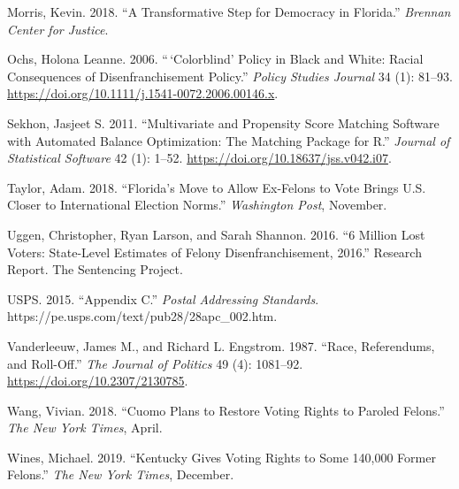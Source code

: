 \documentclass[
  12pt,
]{article}
\newlength{\cslhangindent}
\newenvironment{cslreferences}%
  {\setlength{\parindent}{0pt}%
  \everypar{\setlength{\hangindent}{\cslhangindent}}\ignorespaces}%
  {\par}
\begin{document}
\begin{cslreferences}
\leavevmode\hypertarget{ref-Morris2018}{}%
Morris, Kevin. 2018. ``A Transformative Step for Democracy in Florida.'' \emph{Brennan Center for Justice}.

\leavevmode\hypertarget{ref-Ochs2006}{}%
Ochs, Holona Leanne. 2006. ``\,`Colorblind' Policy in Black and White: Racial Consequences of Disenfranchisement Policy.'' \emph{Policy Studies Journal} 34 (1): 81--93. \url{https://doi.org/10.1111/j.1541-0072.2006.00146.x}.

\leavevmode\hypertarget{ref-Sekhon2011}{}%
Sekhon, Jasjeet S. 2011. ``Multivariate and Propensity Score Matching Software with Automated Balance Optimization: The Matching Package for R.'' \emph{Journal of Statistical Software} 42 (1): 1--52. \url{https://doi.org/10.18637/jss.v042.i07}.

\leavevmode\hypertarget{ref-Taylor2018}{}%
Taylor, Adam. 2018. ``Florida's Move to Allow Ex-Felons to Vote Brings U.S. Closer to International Election Norms.'' \emph{Washington Post}, November.

\leavevmode\hypertarget{ref-sentencing_2016}{}%
Uggen, Christopher, Ryan Larson, and Sarah Shannon. 2016. ``6 Million Lost Voters: State-Level Estimates of Felony Disenfranchisement, 2016.'' Research Report. The Sentencing Project.

\leavevmode\hypertarget{ref-USPS2015}{}%
USPS. 2015. ``Appendix C.'' \emph{Postal Addressing Standards}. https://pe.usps.com/text/pub28/28apc\_002.htm.

\leavevmode\hypertarget{ref-Vanderleeuw1987}{}%
Vanderleeuw, James M., and Richard L. Engstrom. 1987. ``Race, Referendums, and Roll-Off.'' \emph{The Journal of Politics} 49 (4): 1081--92. \url{https://doi.org/10.2307/2130785}.

\leavevmode\hypertarget{ref-Wang2018}{}%
Wang, Vivian. 2018. ``Cuomo Plans to Restore Voting Rights to Paroled Felons.'' \emph{The New York Times}, April.

\leavevmode\hypertarget{ref-Wines2019}{}%
Wines, Michael. 2019. ``Kentucky Gives Voting Rights to Some 140,000 Former Felons.'' \emph{The New York Times}, December.
\end{cslreferences}
\end{document}
